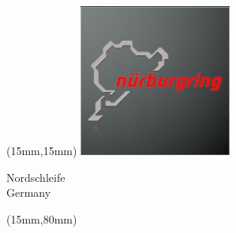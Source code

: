 \begin{textblock*}{50mm}(15mm,15mm)%
\includegraphics[width=50mm]{LG/2015-05-20_00088.png}
\par Nordschleife\\ Germany
\end{textblock*}
\begin{textblock*}{185mm}(15mm,80mm)%
\end{textblock*}
